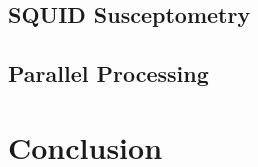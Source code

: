 \documentclass[preprint,12pt]{elsarticle}
\begin{document}
\subsection{SQUID Susceptometry}
\label{section:examples:susceptometry}

\subsection{Parallel Processing}
\label{section:examples:parallel}


\section{Conclusion}
\label{section:conlusion}













\end{document}
